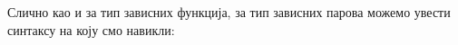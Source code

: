 Слично као и за тип зависних функција, за тип зависних парова можемо увести синтаксу на коју смо навикли:
\begin{code}%
\>[0]\AgdaSpace{}%
\AgdaSymbol{:}\AgdaSpace{}%
\AgdaSymbol{\{}\AgdaSpace{}%
\AgdaSpace{}%
\AgdaSymbol{:}\AgdaSpace{}%
\AgdaSymbol{\}}\AgdaSpace{}%
\AgdaSymbol{(}\AgdaSpace{}%
\AgdaSymbol{:}\AgdaSpace{}%
\AgdaSpace{}%
\AgdaSpace{}%
\AgdaSymbol{)}\AgdaSpace{}%
\AgdaSymbol{(}\AgdaSpace{}%
\AgdaSymbol{:}\AgdaSpace{}%
\AgdaSpace{}%
\AgdaSpace{}%
\AgdaSpace{}%
\AgdaSpace{}%
\AgdaSymbol{)}\AgdaSpace{}%
\AgdaSpace{}%
\AgdaSpace{}%
\AgdaSpace{}%
\AgdaSpace{}%
\<%
\\
\>[0]\AgdaSpace{}%
\AgdaSpace{}%
\AgdaSpace{}%
\AgdaSymbol{=}\AgdaSpace{}%
\AgdaSpace{}%
\<%
\\
%
\\[\AgdaEmptyExtraSkip]%
\>[0]\AgdaSpace{}%
\AgdaSpace{}%
\AgdaSpace{}%
\AgdaSpace{}%
\AgdaSpace{}%
\AgdaSpace{}%
\AgdaSymbol{)}\AgdaSpace{}%
\AgdaSymbol{=}\AgdaSpace{}%
\AgdaSpace{}%
\AgdaSpace{}%
\AgdaSpace{}%
\AgdaSpace{}%
\AgdaFunction{,}\AgdaSpace{}%
\<%
\end{code}

